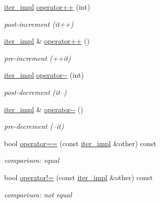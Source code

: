 \begin{DoxyCompactItemize}
\hyperlink{classnlohmann_1_1basic__json_1_1iter__impl}{iter\+\_\+impl} \hyperlink{classnlohmann_1_1basic__json_1_1iter__impl_a74e26f187519bc7181b825b8f38a4e93}{operator++} (int)
\begin{DoxyCompactList}\small\item\em post-\/increment (it++) \end{DoxyCompactList}\item 
\hyperlink{classnlohmann_1_1basic__json_1_1iter__impl}{iter\+\_\+impl} \& \hyperlink{classnlohmann_1_1basic__json_1_1iter__impl_a60e2723dae1c6d537fc914c664f1a81c}{operator++} ()
\begin{DoxyCompactList}\small\item\em pre-\/increment (++it) \end{DoxyCompactList}\item 
\hyperlink{classnlohmann_1_1basic__json_1_1iter__impl}{iter\+\_\+impl} \hyperlink{classnlohmann_1_1basic__json_1_1iter__impl_a0c3a102ac61d4c6f869fe9a5d065e91e}{operator-\/-\/} (int)
\begin{DoxyCompactList}\small\item\em post-\/decrement (it--) \end{DoxyCompactList}\item 
\hyperlink{classnlohmann_1_1basic__json_1_1iter__impl}{iter\+\_\+impl} \& \hyperlink{classnlohmann_1_1basic__json_1_1iter__impl_a50c5d20f733bfe2b13d67366102ba3fe}{operator-\/-\/} ()
\begin{DoxyCompactList}\small\item\em pre-\/decrement (--it) \end{DoxyCompactList}\item 
bool \hyperlink{classnlohmann_1_1basic__json_1_1iter__impl_aa78b38099b3b47838e4f522ad255391d}{operator==} (const \hyperlink{classnlohmann_1_1basic__json_1_1iter__impl}{iter\+\_\+impl} \&other) const 
\begin{DoxyCompactList}\small\item\em comparison\+: equal \end{DoxyCompactList}\item 
bool \hyperlink{classnlohmann_1_1basic__json_1_1iter__impl_a3cd2dca936473ea57656328ab6dc9138}{operator!=} (const \hyperlink{classnlohmann_1_1basic__json_1_1iter__impl}{iter\+\_\+impl} \&other) const 
\begin{DoxyCompactList}\small\item\em comparison\+: not equal \end{DoxyCompactList}\item 

\end{DoxyCompactItemize}
